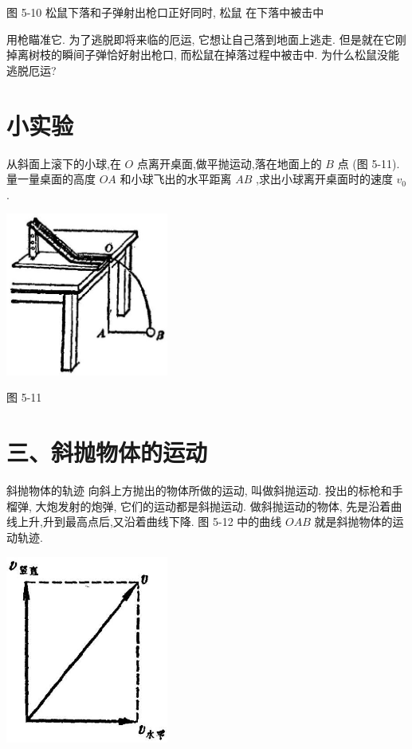 \documentclass[10pt]{article}
\begin{document}
图 5-10 松鼠下落和子弹射出枪口正好同时, 松鼠 在下落中被击中

用枪瞄准它. 为了逃脱即将来临的厄运, 它想让自己落到地面上逃走. 但是就在它刚掉离树枝的瞬间子弹恰好射出枪口, 而松鼠在掉落过程中被击中. 为什么松鼠没能逃脱厄运?

\section*{小实验}

从斜面上滚下的小球,在 \(O\) 点离开桌面,做平抛运动,落在地面上的 \(B\) 点 (图 5-11). 量一量桌面的高度 \({OA}\) 和小球飞出的水平距离 \({AB}\) ,求出小球离开桌面时的速度 \({v}_{0}\) .

\begin{center}
\includegraphics[max width=0.4\textwidth]{images/01912d55-147c-70aa-b0e0-1782a122f948_138_316075.jpg}
\end{center}

图 5-11

\section*{三、斜抛物体的运动}

斜抛物体的轨迹 向斜上方抛出的物体所做的运动, 叫做斜抛运动. 投出的标枪和手榴弹, 大炮发射的炮弹, 它们的运动都是斜抛运动. 做斜抛运动的物体, 先是沿着曲线上升,升到最高点后,又沿着曲线下降. 图 5-12 中的曲线 \({OAB}\) 就是斜抛物体的运动轨迹.

\begin{center}
\includegraphics[max width=0.4\textwidth]{images/01912d55-147c-70aa-b0e0-1782a122f948_138_794457.jpg}
\end{center}
\end{document}
